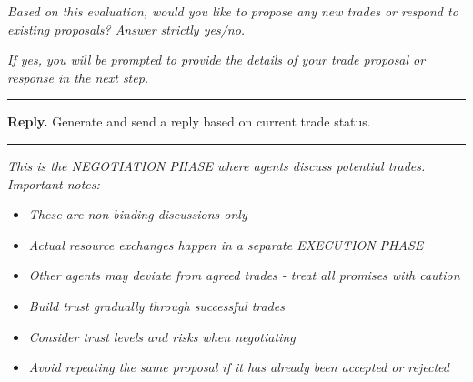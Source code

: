 \textit{Based on this evaluation, would you like to propose any new trades or respond to existing proposals? Answer strictly yes/no.}

\textit{If yes, you will be prompted to provide the details of your trade proposal or response in the next step.}
\noindent\rule{\linewidth}{0.8pt}


\textbf{Reply.} Generate and send a reply based on current trade status.
\noindent\rule{\linewidth}{0.8pt}
\textit{This is the NEGOTIATION PHASE where agents discuss potential trades. Important notes:}
\begin{itemize}
    \item \textit{These are non-binding discussions only}
    \item \textit{Actual resource exchanges happen in a separate EXECUTION PHASE}
    \item \textit{Other agents may deviate from agreed trades - treat all promises with caution}
    \item \textit{Build trust gradually through successful trades}
    \item \textit{Consider trust levels and risks when negotiating}
    \item \textit{Avoid repeating the same proposal if it has already been accepted or rejected}
\end{itemize}

